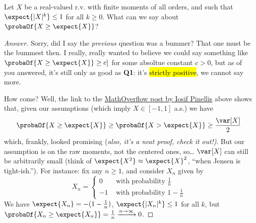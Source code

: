 \documentclass[10pt]{article}
\begin{document}
\begin{quest}
Let $X$ be a real-valued r.v. with finite moments of all orders, and such that $\expect{|X|^k}\leq 1$ for all $k\geq 0$. What can we say about $\probaOf{X \geq \expect{X}}$?
\end{quest}
\begin{proof}[Answer]
Sorry, did I say the \emph{previous} question was a bummer? That one must be the bummest then. I really, really wanted to believe we could say something like $\probaOf{X \geq \expect{X}} \geq c]$ for some absoltue constant $c>0$, but as  of you answered, it's still only as good as \textbf{Q1}: it's \hl{strictly positive}, we cannot say more.

How come? Well, the link to the \href{https://mathoverflow.net/a/358212/37266}{MathOverflow post by Iosif Pinellis} above shows that, given our assumptions (which imply $X \in [-1,1]$ a.s.) we have
\[
    \probaOf{X \geq \expect{X}} \geq \probaOf{X > \expect{X}} \geq \frac{\var[X]}{2}
\]
which, frankly, looked promising (\emph{also, it's a neat proof, check it out!)}. But our assumption is on the raw moments, not the centered ones, so\dots{} $\var[X]$ can still be arbitrarily small (think of $\expect{X^2} \approx \expect{X}^2$, ``when {Jensen} is tight-ish.''). For instance:
fix any $n\geq 1$, and consider $X_n$ given by
\[
  X_n = \begin{cases}
      0 & \text{ with probability } \frac{1}{n}\\
      -1 & \text{ with probability } 1-\frac{1}{n}
    \end{cases}
\]
We have $\expect{X_n}=-(1-\frac{1}{n})$, $\expect{|X_n|^k} \leq 1$ for all $k$, but $\probaOf{X_n \geq \expect{X_n}} = \frac{1}{n} \xrightarrow[]{n\to\infty} 0$.
\end{proof}
\end{document}
